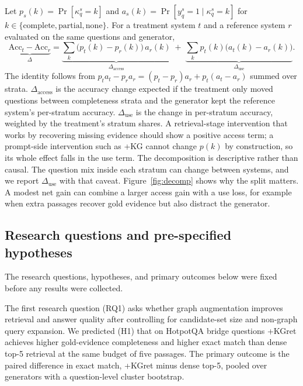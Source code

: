 \documentclass[preprint,12pt]{elsarticle}
\begin{document}
Let $p_s(k)=\Pr[\kappa_q^{s}=k]$ and $a_s(k)=\Pr[y_q^{s}=1\mid\kappa_q^{s}=k]$
for $k\in\{\text{complete},\text{partial},\text{none}\}$. For a treatment
system $t$ and a reference system $r$ evaluated on the same questions and
generator,
\begin{equation}
\label{eq:decomp}
\underbrace{\mathrm{Acc}_t-\mathrm{Acc}_r}_{\Delta}
= \underbrace{\sum_k \bigl(p_t(k)-p_r(k)\bigr)\,a_r(k)}_{\Delta_{\text{access}}}
\; + \;
\underbrace{\sum_k p_t(k)\bigl(a_t(k)-a_r(k)\bigr)}_{\Delta_{\text{use}}} .
\end{equation}
The identity follows from $p_t a_t - p_r a_r = (p_t-p_r)a_r + p_t(a_t-a_r)$
summed over strata. $\Delta_{\text{access}}$ is the accuracy change expected
if the treatment only moved questions between completeness strata and the
generator kept the reference system's per-stratum accuracy.
$\Delta_{\text{use}}$ is the change in per-stratum accuracy, weighted by the
treatment's stratum shares. A retrieval-stage intervention that works by
recovering missing evidence should show a positive access term; a
prompt-side intervention such as +KG cannot change $p(k)$ by construction, so
its whole effect falls in the use term. The decomposition is descriptive
rather than causal. The question mix inside each stratum can change between
systems, and we report $\Delta_{\text{use}}$ with that caveat.
Figure~\ref{fig:decomp} shows why the split matters. A modest net gain can
combine a larger access gain with a use loss, for example when extra passages
recover gold evidence but also distract the generator.



\subsection{Research questions and pre-specified hypotheses}
\label{sec:rqs}

The research questions, hypotheses, and primary outcomes below were fixed
before any results were collected.

The first research question (RQ1) asks whether graph augmentation improves
retrieval and answer quality after controlling for candidate-set size and
non-graph query expansion. We predicted (H1) that on HotpotQA bridge questions
+KGret achieves higher gold-evidence completeness and higher exact match than
dense top-5 retrieval at the same budget of five passages. The primary outcome
is the paired difference in exact match, +KGret minus dense top-5, pooled over
generators with a question-level cluster bootstrap.
\end{document}
